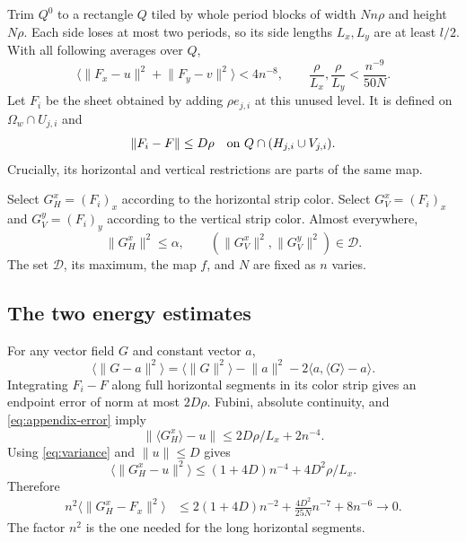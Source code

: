 \documentclass[
  11pt,
]{article}
\theoremstyle{remark}\newtheorem{remark}[theorem]{Remark}
\newcommand{\norm}[1]{\lVert#1\rVert}\newcommand{\ip}[2]{\langle#1,#2\rangle}
\newcommand{\av}[1]{\langle#1\rangle}\newcommand{\dimA}{\dim_{\mathrm A}}
\begin{document}
Trim $Q^0$ to a rectangle $Q$ tiled by whole period blocks of width $Nn\rho$ and height $N\rho$. Each side loses at most two periods, so its side lengths $L_x,L_y$ are at least $l/2$. With all following averages over $Q$,
\begin{equation}\label{eq:appendix-error}
 \av{\norm{F_x-u}^2+\norm{F_y-v}^2}<4n^{-8},
 \qquad \frac{\rho}{L_x},\frac{\rho}{L_y}<\frac{n^{-9}}{50N}.
\end{equation}
Let $F_i$ be the sheet obtained by adding $\rho e_{j,i}$ at this unused level. It is defined on $\Omega_w\cap U_{j,i}$ and
\begin{equation}\label{eq:offset}
 \norm{F_i-F}\le D\rho
 \quad\hbox{on }Q\cap(H_{j,i}\cup V_{j,i}).
\end{equation}
Crucially, its horizontal and vertical restrictions are parts of the same map.

Select $G_H^x=(F_i)_x$ according to the horizontal strip color. Select $G_V^x=(F_i)_x$ and $G_V^y=(F_i)_y$ according to the vertical strip color. Almost everywhere,
\[
 \norm{G_H^x}^2\le\alpha,\qquad
 (\norm{G_V^x}^2,\norm{G_V^y}^2)\in\mathcal D.
\]
The set $\mathcal D$, its maximum, the map $f$, and $N$ are fixed as $n$ varies.

\subsection{The two energy estimates}
For any vector field $G$ and constant vector $a$,
\begin{equation}\label{eq:variance}
 \av{\norm{G-a}^2}
 =\av{\norm G^2}-\norm a^2-2\ip{a}{\av G-a}.
\end{equation}
Integrating $F_i-F$ along full horizontal segments in its color strip gives an endpoint error of norm at most $2D\rho$. Fubini, absolute continuity, and \eqref{eq:appendix-error} imply
\[
 \norm{\av{G_H^x}-u}\le2D\rho/L_x+2n^{-4}.
\]
Using \eqref{eq:variance} and $\norm u\le D$ gives
\[
 \av{\norm{G_H^x-u}^2}\le(1+4D)n^{-4}+4D^2\rho/L_x.
\]
Therefore
\begin{equation}\label{eq:horiz-rate}
 \begin{split}
 n^2\av{\norm{G_H^x-F_x}^2}
 &\le2(1+4D)n^{-2}
       +\frac{4D^2}{25N}n^{-7}+8n^{-6}\longrightarrow0.
 \end{split}
\end{equation}
The factor $n^2$ is the one needed for the long horizontal segments.
\end{document}
